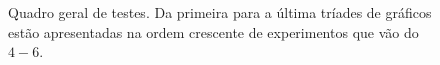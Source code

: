 \documentclass[journal, a4paper]{IEEEtran}
\begin{document}
\begin{figure}[ht!]
	\centering
    \quad %
    \quad %
    \caption{Quadro geral de testes. Da primeira para a última tríades de gráficos estão apresentadas na ordem crescente de experimentos que vão do $4-6$. }
\end{figure}
\end{document}
